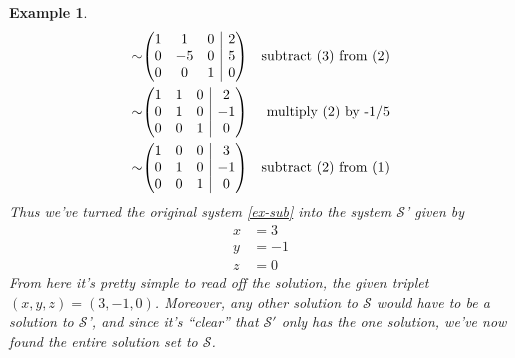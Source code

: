 \documentclass[12pt]{article}
\makeatletter
\numberwithin{equation}{subsection}
\numberwithin{figure}{subsection}
\theoremstyle{note}
\newtheorem{example}[subsection]{Example}
\newenvironment{amatrix}[1]{%
  \left(\begin{array}{@{}*{#1}{c}|c@{}}
}{%
  \end{array}\right)
}
\makeatother
\begin{document}
\begin{example}
{\begin{align*}
\sim & \begin{amatrix}{3}  1 & 1 & 0 & 2 \\ 0 & -5 & 0 & 5 \\  0 & 0 & 1 & 0 \end{amatrix} & \text{subtract (3) from (2)} \\
\sim & \begin{amatrix}{3}  1 & 1 & 0 & 2 \\ 0 & 1 & 0 & -1 \\  0 & 0 & 1 & 0 \end{amatrix} & \text{multiply (2) by -1/5}\\
\sim & \begin{amatrix}{3}  1 & 0 & 0 & 3 \\ 0 & 1 & 0 & -1 \\  0 & 0 & 1 & 0 \end{amatrix}& \text{subtract (2) from (1)}\\
\end{align*}}
Thus we've turned the original system \eqref{ex-sub} into the system $\mathcal{S}$' given by  \begin{align} x &= 3 \nonumber \\ y&=-1 \nonumber\\ z&=0 \end{align} From here it's pretty simple to read off the solution, the given triplet $(x,y,z)=(3,-1,0)$. Moreover, any other solution to $\mathcal{S}$ would \textit{have to} be a solution to $\mathcal{S}$', and since it's ``clear'' that $\mathcal{S}'$ only has the one solution, we've now found the entire solution set to $\mathcal{S}$. 
\end{example}
\end{document}
